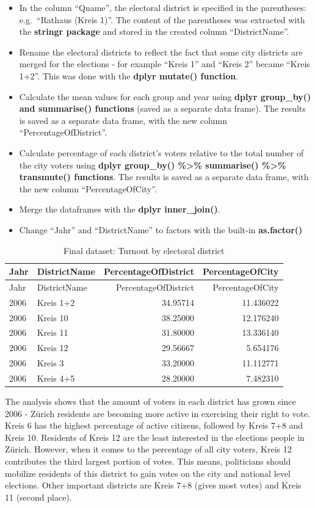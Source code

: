 \documentclass[
]{article}
\providecommand{\tightlist}{%
  \setlength{\itemsep}{0pt}\setlength{\parskip}{0pt}}
\begin{document}
\begin{itemize}
\tightlist
\item
  In the column ``Qname'', the electoral district is specified in the
  parentheses: e.g.~``Rathaus (Kreis 1)''. The content of the
  parentheses was extracted with the \textbf{stringr package} and stored
  in the created column ``DistrictName''.
\item
  Rename the electoral districts to reflect the fact that some city
  districts are merged for the elections - for example ``Kreis 1'' and
  ``Kreis 2'' became ``Kreis 1+2''. This was done with the \textbf{dplyr
  mutate() function}.
\item
  Calculate the mean values for each group and year using \textbf{dplyr
  group\_by() and summarise() functions} (saved as a separate data
  frame). The results is saved as a separate data frame, with the new
  column ``PercentageOfDistrict''.
\item
  Calculate percentage of each district's voters relative to the total
  number of the city voters using \textbf{dplyr group\_by()
  \%\textgreater\% summarise() \%\textgreater\% transmute() functions}.
  The results is saved as a separate data frame, with the new column
  ``PercentageOfCity''.
\item
  Merge the dataframes with the \textbf{dplyr inner\_join()}.
\item
  Change ``Jahr'' and ``DistrictName'' to factors with the built-in
  \textbf{as.factor()}
\end{itemize}

\begin{longtable}[]{@{}llrr@{}}
\caption{Final dataset: Turnout by electoral district}\tabularnewline
\toprule
Jahr & DistrictName & PercentageOfDistrict &
PercentageOfCity\tabularnewline
\midrule
\endfirsthead
\toprule
Jahr & DistrictName & PercentageOfDistrict &
PercentageOfCity\tabularnewline
\midrule
\endhead
2006 & Kreis 1+2 & 34.95714 & 11.436022\tabularnewline
2006 & Kreis 10 & 38.25000 & 12.176240\tabularnewline
2006 & Kreis 11 & 31.80000 & 13.336140\tabularnewline
2006 & Kreis 12 & 29.56667 & 5.654176\tabularnewline
2006 & Kreis 3 & 33.20000 & 11.112771\tabularnewline
2006 & Kreis 4+5 & 28.20000 & 7.482310\tabularnewline
\bottomrule
\end{longtable}

The analysis shows that the amount of voters in each district has grown
since 2006 - Zürich residents are becoming more active in exercising
their right to vote. Kreis 6 has the highest percentage of active
citizens, followed by Kreis 7+8 and Kreis 10. Residents of Kreis 12 are
the least interested in the elections people in Zürich. However, when it
comes to the percentage of all city voters, Kreis 12 contributes the
third largest portion of votes. This means, politicians should mobilize
residents of this district to gain votes on the city and national level
elections. Other important districts are Kreis 7+8 (gives most votes)
and Kreis 11 (second place).
\end{document}
